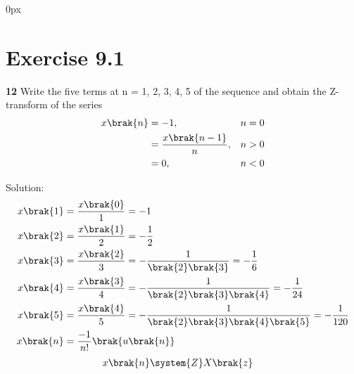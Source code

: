\documentclass[journal,12pt,twocolumn]{IEEEtran}
\begin{document}
\parindent 0px


\vspace{3cm}

\title{}
\author{EE23BTECH11217 - Prajwal M$^{*}$
}
\maketitle
\newpage
\bigskip

 \renewcommand{\thefigure}{\theenumi}
 \renewcommand{\thetable}{\theenumi}


\section*{Exercise 9.1}

\noindent \textbf{12} \hspace{2pt}Write the five terms at n = 1, 2, 3, 4, 5 of the sequence and obtain the Z-transform of the series
\begin{align}
    x \brak{n} &=  -1, & n = 0 \\
    &=   \frac{x \brak{n-1}}{n}, & n > 0\\
    &=   0, & n < 0 
\end{align}

\noindent Solution:
\fi
\noindent
\begin{align}
	x \brak{1} & = \frac{x \brak{0}}{1} = -1 \\
x \brak{2} & = \frac{x \brak{1}}{2} = -\frac{1}{2} \\
	x \brak{3} & = \frac{x \brak{2}}{3} = -\frac{1}{\brak{2} \brak{3}} = -\frac{1}{6}\\
	x \brak{4} & = \frac{x \brak{3}}{4} = -\frac{1}{\brak{2}   \brak{3} \brak{4}} = -\frac{1}{24}\\
	x \brak{5} & = \frac{x \brak{4}}{5} = -\frac{1}{\brak{2} \brak{3} \brak{4} \brak{5}} = -\frac{1}{120} \\
    x \brak{n} & = \frac{-1}{n!}  \brak{u \brak{n}} \label{x(n)}
\end{align}
\begin{align}
	x \brak{n} & \system{Z} X \brak{z} 
\end{align}
\end{document}
